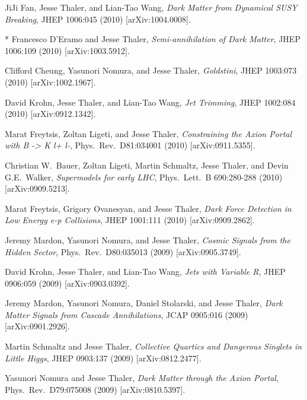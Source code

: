 \begin{list}{[]\addtocounter{jessecount}{-1}}{\leftmargin=3em \itemsep=4pt}
\item
 JiJi Fan, Jesse Thaler, and Lian-Tao Wang,
\emph{Dark Matter from Dynamical SUSY Breaking},
JHEP 1006:045 (2010)
[arXiv:1004.0008].

\item
* Francesco D'Eramo and Jesse Thaler,
\emph{Semi-annihilation of Dark Matter},
JHEP 1006:109 (2010)
[arXiv:1003.5912].

\item
 Clifford Cheung, Yasunori Nomura, and Jesse Thaler,
\emph{Goldstini},
JHEP 1003:073 (2010)
[arXiv:1002.1967].

\item
 David Krohn, Jesse Thaler, and Lian-Tao Wang,
\emph{Jet Trimming},
JHEP 1002:084 (2010)
[arXiv:0912.1342].

\item
 Marat Freytsis, Zoltan Ligeti, and Jesse Thaler,
\emph{Constraining the Axion Portal with B -> K l+ l-},
Phys.\ Rev.\ D81:034001 (2010)
[arXiv:0911.5355].

\item
 Christian W.\ Bauer, Zoltan Ligeti, Martin Schmaltz, Jesse Thaler, and Devin G.E.\ Walker,
\emph{Supermodels for early LHC},
Phys.\ Lett.\ B 690:280-288 (2010)
[arXiv:0909.5213].

\item
 Marat Freytsis, Grigory Ovanesyan, and Jesse Thaler,
\emph{Dark Force Detection in Low Energy e-p Collisions},
JHEP 1001:111 (2010)
[arXiv:0909.2862].

\item
 Jeremy Mardon, Yasunori Nomura, and Jesse Thaler,
\emph{Cosmic Signals from the Hidden Sector},
Phys.\ Rev.\ D80:035013 (2009)
[arXiv:0905.3749].

\item
 David Krohn, Jesse Thaler, and Lian-Tao Wang,
\emph{Jets with Variable R},
JHEP 0906:059 (2009)
[arXiv:0903.0392].

\item
 Jeremy Mardon, Yasunori Nomura, Daniel Stolarski, and Jesse Thaler,
\emph{Dark Matter Signals from Cascade Annihilations},
JCAP 0905:016 (2009)
[arXiv:0901.2926].

\item
 Martin Schmaltz and Jesse Thaler,
\emph{Collective Quartics and Dangerous Singlets in Little Higgs},
JHEP 0903:137 (2009)
[arXiv:0812.2477].

\item
 Yasunori Nomura and Jesse Thaler,
\emph{Dark Matter through the Axion Portal},
Phys.\ Rev.\ D79:075008 (2009)
[arXiv:0810.5397].


\end{list}

